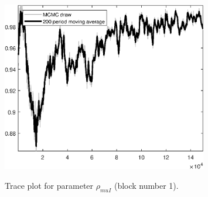 \begin{figure}[H]
\centering
  \includegraphics[width=0.8\textwidth]{BRS_sectoral_wo_gmf/graphs/TracePlot_rho_muI_blck_1}\\
    \caption{Trace plot for parameter ${\rho_{muI}}$ (block number 1).}
\end{figure}
